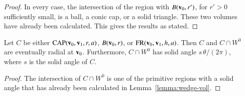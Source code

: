 \begin{proof} In every case, the intersection of 
the region with $B({\mathbf v}_0,r')$, for $r'>0$ sufficiently small, is a ball,
a conic cap, or a solid triangle.  These two volumes have
already been calculated.  This gives the results as stated.
\end{proof}

\begin{lemma}\label{lemma:wedge-sol}  
Let $C$ be either ${\operatorname{CAP}}({\mathbf v}_0,{\mathbf v}_1,r,a)$, $B({\mathbf v}_0,r)$, or
${\operatorname{FR}}({\mathbf v}_0,{\mathbf v}_1,h,a)$.  Then $C$ and $C\cap W^0$ are eventually
radial at ${\mathbf v}_0$. Furthermore, $C\cap W^0$ has solid angle
$s\,\theta/(2\pi)$, where $s$ is the solid angle of $C$.
\end{lemma}

\begin{proof} The intersection of $C\cap W^0$ is one of the primitive
  regions with a solid angle that has already been calculated in
  Lemma~\ref{lemma:wedge-vol}.
\end{proof}



